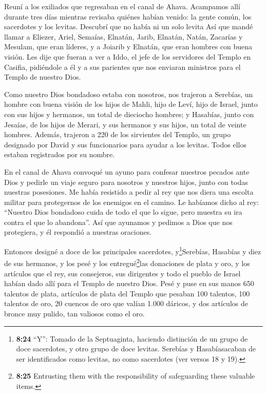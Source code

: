  Reuní a los exiliados que regresaban en el canal de Ahava.
Acampamos allí durante tres días mientras revisaba quiénes habían
venido: la gente común, los sacerdotes y los levitas. Descubrí que no
había ni un solo levita  Así que mandé llamar a Eliezer,
Ariel, Semaías, Elnatán, Jarib, Elnatán, Natán, Zacarías y Mesulam, que
eran líderes, y a Joiarib y Elnatán, que eran hombres con buena visión.
 Les dije que fueran a ver a Iddo, el jefe de los
servidores del Templo en Casifia, pidiéndole a él y a sus parientes que
nos enviaran ministros para el Templo de nuestro Dios.

 Como nuestro Dios bondadoso estaba con nosotros, nos
trajeron a Serebías, un hombre con buena visión de los hijos de Mahli,
hijo de Leví, hijo de Israel, junto con sus hijos y hermanos, un total
de dieciocho hombres;  y Hasabías, junto con Jesaías, de
los hijos de Merari, y sus hermanos y sus hijos, un total de veinte
hombres.  Además, trajeron a 220 de los sirvientes del
Templo, un grupo designado por David y sus funcionarios para ayudar a
los levitas. Todos ellos estaban registrados por su nombre.

 En el canal de Ahava convoqué un ayuno para confesar
nuestros pecados ante Dios y pedirle un viaje seguro para nosotros y
nuestros hijos, junto con todas nuestras posesiones.  Me
había resistido a pedir al rey que nos diera una escolta militar para
protegernos de los enemigos en el camino. Le habíamos dicho al rey:
``Nuestro Dios bondadoso cuida de todo el que lo sigue, pero muestra su
ira contra el que lo abandona''.  Así que ayunamos y
pedimos a Dios que nos protegiera, y él respondió a nuestras oraciones.

 Entonces designé a doce de los principales sacerdotes,
y\footnote{\textbf{8:24} ``Y'': Tomado de la Septuaginta, haciendo
  distinción de un grupo de doce sacerdotes, y otro grupo de doce
  levitas. Serebías y Hasabíasacaban de ser identificados como levitas,
  no como sacerdotes (ver versos 18 y 19).}Serebías, Hasabías y diez de
sus hermanos,  y los pesé y los entregué\footnote{\textbf{8:25}
  Entrusting them with the responsibility of safeguarding these valuable
  items.}las donaciones de plata y oro, y los artículos que el rey, sus
consejeros, sus dirigentes y todo el pueblo de Israel habían dado allí
para el Templo de nuestro Dios.  Pesé y puse en sus manos
650 talentos de plata, artículos de plata del Templo que pesaban 100
talentos, 100 talentos de oro,  20 cuencos de oro que
valían 1.000 dáricos, y dos artículos de bronce muy pulido, tan valiosos
como el oro.

